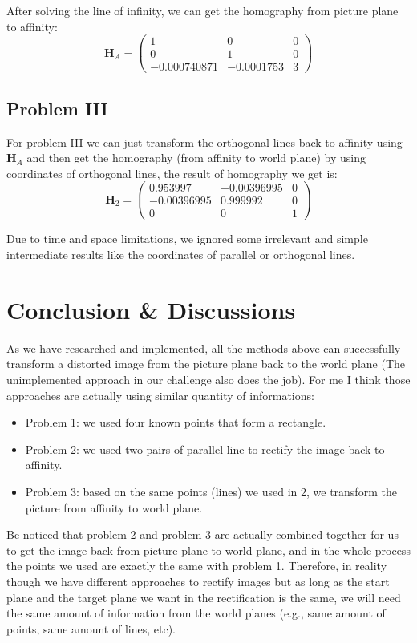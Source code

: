 \documentclass[conference]{IEEEtran}
\newcommand{\mat}[1]{\mathbf{#1}} %
\begin{document}
After solving the line of infinity, we can get the homography from picture plane to affinity:
\begin{equation}
	\mat{H}_A=
	\begin{pmatrix}
		1 & 0 & 0\\
		0 & 1 & 0\\
		-0.000740871 & -0.0001753 & 3
	\end{pmatrix}
\end{equation}

\subsection{Problem III}
For problem III we can just transform the orthogonal lines back to affinity using $\mat{H}_A$ and then get the homography (from affinity to world plane) by using coordinates of orthogonal lines, the result of homography we get is:
\begin{equation}
	\mat{H}_2=
	\begin{pmatrix}
		0.953997 & -0.00396995 & 0\\
		-0.00396995 & 0.999992 & 0\\
		0 & 0 & 1
	\end{pmatrix}
\end{equation}

Due to time and space limitations, we ignored some irrelevant and simple intermediate results like the coordinates of parallel or orthogonal lines.

\section{Conclusion \& Discussions}
As we have researched and implemented, all the methods above can successfully transform a distorted image from the picture plane back to the world plane (The unimplemented approach in our challenge also does the job). For me I think those approaches are actually using similar quantity of informations:
\begin{itemize}
	\item Problem 1: we used four known points that form a rectangle.
	\item Problem 2: we used two pairs of parallel line to rectify the image back to affinity.
	\item Problem 3: based on the same points (lines) we used in 2, we transform the picture from affinity to world plane.
\end{itemize}
Be noticed that problem 2 and problem 3 are actually combined together for us to get the image back from picture plane to world plane, and in the whole process the points we used are exactly the same with problem 1. Therefore, in reality though we have different approaches to rectify images but as long as the start plane and the target plane we want in the rectification is the same, we will need the same amount of information from the world planes (e.g., same amount of points, same amount of lines, etc). 
\end{document}
